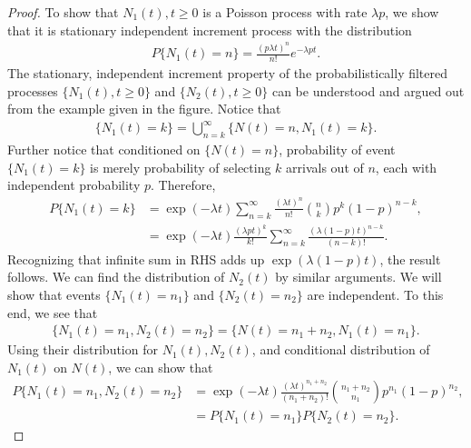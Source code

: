 \documentclass[a4paper,10pt,english]{article}
\begin{document}
\begin{proof} To show that ${N_{1}(t), t \geq 0}$ is a Poisson process with rate $\lambda p$, we show that it is stationary independent increment process with the distribution
\begin{align*}
 P\{N_{1}(t)= n\}  = \frac{(p \lambda t)^{n}}{n!}e^{-\lambda p t}.
\end{align*}
The stationary, independent increment property of the probabilistically filtered processes $\{N_1(t), t \geqslant 0\}$ and $\{N_2(t), t \geqslant 0\}$ can be understood and argued out from the example given in the figure. Notice that 
\begin{align*}
	\{N_1(t)=k\} = \bigcup_{n=k}^\infty\{N(t) = n, N_1(t) = k\}.
\end{align*}
Further notice that conditioned on $\{N(t) = n\}$, probability of event $\{N_1(t) = k\}$ is merely probability of selecting $k$ arrivals out of $n$, each with independent probability $p$. Therefore, 
\begin{align*}
	P\{N_1(t)=k\} &= \exp(-\lambda t)\sum_{n=k}^\infty\frac{(\lambda t)^n}{n!}\binom{n}{k}p^k(1-p)^{n-k},\\
	&= \exp(-\lambda t)\frac{(\lambda p t)^k}{k!}\sum_{n=k}^\infty\frac{(\lambda(1-p)t)^{n-k}}{(n-k)!}.%
\end{align*}
Recognizing that infinite sum in RHS adds up $\exp(\lambda(1-p)t)$, the result follows. We can find the distribution of $N_2(t)$ by similar arguments. We will show that events $\{N_1(t) = n_1\}$ and $\{N_2(t) = n_2\}$ are independent. To this end, we see that 
\begin{align*}
	\{N_1(t) = n_1, N_2(t) = n_2\} = \{N(t) = n_1 + n_2, N_1(t) = n_1\}.
\end{align*}
Using their distribution for $N_1(t), N_2(t)$, and conditional distribution of $N_1(t)$ on $N(t)$, we can show that
\begin{align*}
	P\{N_1(t) = n_1, N_2(t) = n_2\} &= \exp(-\lambda t)\frac{(\lambda t)^{n_1 + n_2}}{(n_1 + n_2)!}\binom{n_1 + n_2}{n_1}p^{n_1}(1-p)^{n_2},\\
	&= P\{N_1(t) = n_1\}P\{N_2(t) = n_2\} .
\end{align*}



\end{proof}
\end{document}
